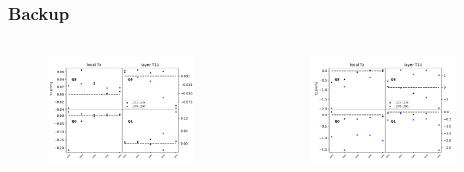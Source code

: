\documentclass[aspectratio=1610, 12pt]{beamer}
\begin{document}
\begin{frame}\frametitle{Backup}
  \begin{columns}
    \begin{column}[c]{0.48\textwidth}
      \begin{figure}
        \includegraphics[width=0.9\textwidth]{plots/stability_plots/diff_MU_T1U_Tx.pdf}
      \end{figure}  
    \end{column}
    \begin{column}[c]{0.48\textwidth}
      \begin{figure}
        \includegraphics[width=0.9\textwidth]{plots/stability_plots/diff_MU_T1U_Tz.pdf}
      \end{figure}  
    \end{column}
  \end{columns}
\end{frame}
\end{document}
